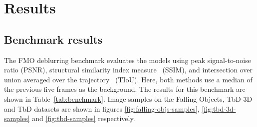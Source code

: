 \newcommand{\samples}[2]{%
    \begin{figure}
        \centering

        \begin{subfigure}{0.19\textwidth}
            \texttt{[image: images/results/\#1.jpg]}
            \caption*{Input}
        \end{subfigure}
        \hfill
        \begin{subfigure}{0.79\textwidth}
            \setlength{\abovecaptionskip}{1mm}
            \foreach [count=\i from 1] \method/\name in {GT/gt,DeFMO/old,Ours/new}{%
                \begin{subfigure}{\textwidth}
                    \rotatebox{90}{\method}
                    \foreach \j in {0,...,7}{%
                        \texttt{[image: images/results/\\name/\#1-\\j.jpg]}%
                        \ifthenelse{\equal{\j}{7}}{}{\hfill}%
                    }
                \end{subfigure}%
                \ifthenelse{\equal{\i}{3}}{}{\vspace{1mm}}
            }
            \caption*{Output}
        \end{subfigure}

        \caption{Sample outputs on the #2 dataset.}%
        \label{fig:#1-samples}
    \end{figure}
}

\section{Results}

\subsection{Benchmark results}
    The FMO deblurring benchmark evaluates the models using peak signal-to-noise ratio (PSNR), structural similarity index measure~\citep{ssim} (SSIM), and intersection over union averaged over the trajectory~\citep{tiou} (TIoU).
    Here, both methods use a median of the previous five frames as the background.
    The results for this benchmark are shown in Table~\ref{tab:benchmark}.
    Image samples on the Falling Objects, TbD-3D and TbD datasets are shown in figures \ref{fig:falling-objs-samples}, \ref{fig:tbd-3d-samples} and \ref{fig:tbd-samples} respectively.%

